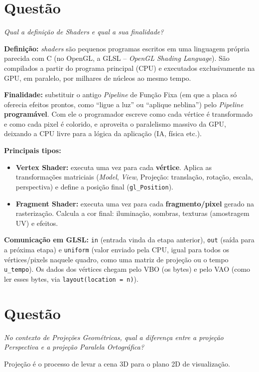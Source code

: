 \documentclass{article}
\newcounter{questao}
\newcommand{\questao}[1]{%
      \stepcounter{questao}%
      \section*{Questão \arabic{questao}}%
      \textit{#1}\par\medskip}
\begin{document}
\questao{Qual a definição de Shaders e qual a sua finalidade?}

\textbf{Definição:} \textit{shaders} são pequenos programas escritos em uma linguagem própria parecida com C (no OpenGL, a GLSL -- \textit{OpenGL Shading Language}). São compilados a partir do programa principal (CPU) e executados exclusivamente na GPU, em paralelo, por milhares de núcleos ao mesmo tempo.

\textbf{Finalidade:} substituir o antigo \textit{Pipeline} de Função Fixa (em que a placa só oferecia efeitos prontos, como ``ligue a luz'' ou ``aplique neblina'') pelo \textit{Pipeline} \textbf{programável}. Com ele o programador escreve como cada vértice é transformado e como cada pixel é colorido, e aproveita o paralelismo massivo da GPU, deixando a CPU livre para a lógica da aplicação (IA, física etc.).

\textbf{Principais tipos:}
\begin{itemize}
      \item \textbf{Vertex Shader:} executa uma vez para cada \textbf{vértice}. Aplica as transformações matriciais (\textit{Model}, \textit{View}, Projeção: translação, rotação, escala, perspectiva) e define a posição final (\texttt{gl\_Position}).
      \item \textbf{Fragment Shader:} executa uma vez para cada \textbf{fragmento/pixel} gerado na rasterização. Calcula a cor final: iluminação, sombras, texturas (amostragem UV) e efeitos.
\end{itemize}

\textbf{Comunicação em GLSL:} \texttt{in} (entrada vinda da etapa anterior), \texttt{out} (saída para a próxima etapa) e \texttt{uniform} (valor enviado pela CPU, igual para todos os vértices/pixels naquele quadro, como uma matriz de projeção ou o tempo \texttt{u\_tempo}). Os dados dos vértices chegam pelo VBO (os bytes) e pelo VAO (como ler esses bytes, via \texttt{layout(location = n)}).

\questao{No contexto de Projeções Geométricas, qual a diferença entre a projeção Perspectiva e a projeção Paralela Ortográfica?}

Projeção é o processo de levar a cena 3D para o plano 2D de visualização.
\end{document}
